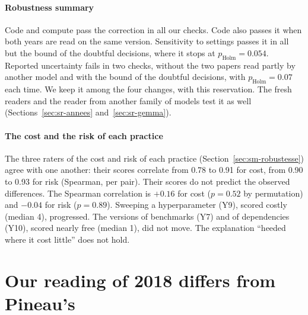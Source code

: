 \paragraph{Robustness summary}
Code and compute pass the correction in all our checks. Code also passes it when both years are read on the
same version. Sensitivity to settings passes it in all but the
bound of the doubtful decisions, where it stops at $p_{\text{Holm}} = 0.054$. Reported uncertainty fails
in two checks, without the two papers read partly by another model and with the bound of the doubtful
decisions, with $p_{\text{Holm}} = 0.07$ each time. We keep it among the four changes, with this
reservation. The fresh readers and the reader from another family of models test it as well
(Sections~\ref{sec:sr-annees} and~\ref{sec:sr-gemma}).

\paragraph{The cost and the risk of each practice}
The three raters of the cost and risk of each practice (Section~\ref{sec:sm-robustesse}) agree with
one another: their scores correlate from 0.78 to 0.91 for cost, from 0.90
to 0.93 for risk (Spearman, per pair). Their scores do not predict the observed differences. The Spearman
correlation is $+0.16$ for cost ($p = 0.52$ by permutation) and $-0.04$ for risk ($p = 0.89$). Sweeping
a hyperparameter (Y9), scored costly (median 4), progressed. The versions of benchmarks (Y7) and of
dependencies (Y10), scored nearly free (median 1), did not move. The explanation \enquote{heeded where it
cost little} does not hold.

\section{Our reading of 2018 differs from Pineau's}\label{sec:sr-pineau}

